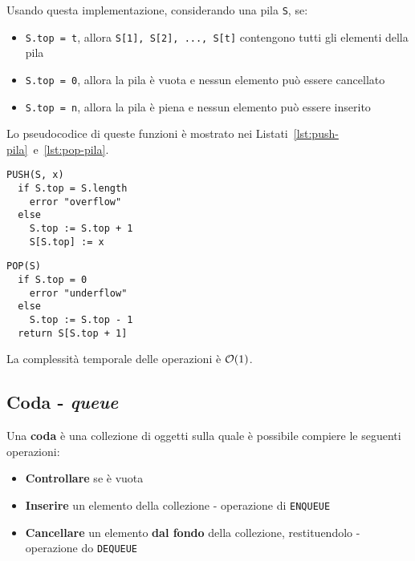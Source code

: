 \documentclass[italian, 10pt]{article}
\begin{document}
Usando questa implementazione, considerando una pila \texttt{S}, se:

\begin{itemize}
  \item \texttt{S.top = t}, allora \texttt{S[1], S[2], ..., S[t]} contengono tutti gli elementi della pila
  \item \texttt{S.top = 0}, allora la pila è vuota e nessun elemento può essere cancellato
  \item \texttt{S.top = n}, allora la pila è piena e nessun elemento può essere inserito
\end{itemize}

\bigskip
Lo pseudocodice di queste funzioni è mostrato nei Listati~\ref{lst:push-pila}~e~\ref{lst:pop-pila}.

\begin{minipage}[t]{0.495\textwidth}
  \begin{lstlisting}[style=pseudocode, caption={\texttt{PUSH} in pila}, label={lst:push-pila}]
PUSH(S, x)
  if S.top = S.length
    error "overflow"
  else
    S.top := S.top + 1
    S[S.top] := x
  \end{lstlisting}
\end{minipage}
\begin{minipage}[t]{0.495\textwidth}
  \begin{lstlisting}[style=pseudocode, caption={\texttt{POP} in pila}, label={lst:pop-pila}]
POP(S)
  if S.top = 0
    error "underflow"
  else
    S.top := S.top - 1
  return S[S.top + 1]
  \end{lstlisting}
\end{minipage}

La complessità temporale delle operazioni è \(\mathcal{O}(1)\).

\subsection{Coda - \textit{queue}}

Una \textbf{coda} è una collezione di oggetti sulla quale è possibile compiere le seguenti operazioni:

\begin{itemize}
  \item \textbf{Controllare} se è vuota
  \item \textbf{Inserire} un elemento della collezione - operazione di \texttt{ENQUEUE}
  \item \textbf{Cancellare} un elemento \textbf{dal fondo} della collezione, restituendolo - operazione do \texttt{DEQUEUE}
\end{itemize}
\end{document}

